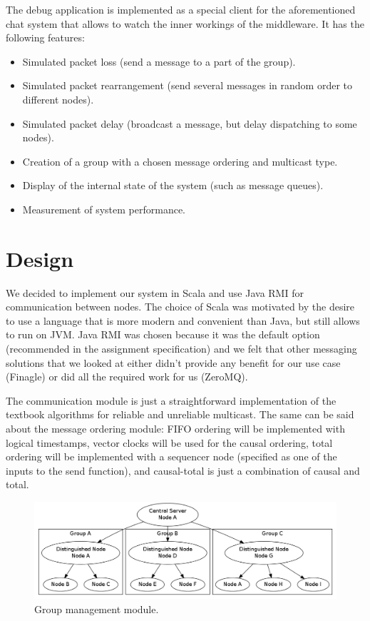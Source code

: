 \documentclass[10pt, oneside]{article}
\begin{document}
The debug application is implemented as a special client for the aforementioned
chat system that allows to watch the inner workings of the middleware. It has
the following features:
\begin{itemize}
\item Simulated packet loss (send a message to a part of the group).
\item Simulated packet rearrangement (send several messages in random order to
  different nodes).
\item Simulated packet delay (broadcast a message, but delay dispatching to some
  nodes).
\item Creation of a group with a chosen message ordering and multicast type.
\item Display of the internal state of the system (such as message queues).
\item Measurement of system performance.
\end{itemize}

\section{Design}

We decided to implement our system in Scala and use Java RMI for communication
between nodes. The choice of Scala was motivated by the desire to use a language
that is more modern and convenient than Java, but still allows to run on
JVM. Java RMI was chosen because it was the default option (recommended in the
assignment specification) and we felt that other messaging solutions that we
looked at either didn't provide any benefit for our use case (Finagle) or did
all the required work for us (ZeroMQ).

The communication module is just a straightforward implementation of the
textbook algorithms for reliable and unreliable multicast\cite{Textbook}. The
same can be said about the message ordering module: FIFO ordering will be
implemented with logical timestamps, vector clocks will be used for the causal
ordering, total ordering will be implemented with a sequencer node (specified as
one of the inputs to the send function), and causal-total is just a combination
of causal and total.

\begin{figure}[h]
\centering
\includegraphics[width=12cm]{graph1}
\caption{Group management module.}
\label{fig:group}
\end{figure}
\end{document}

